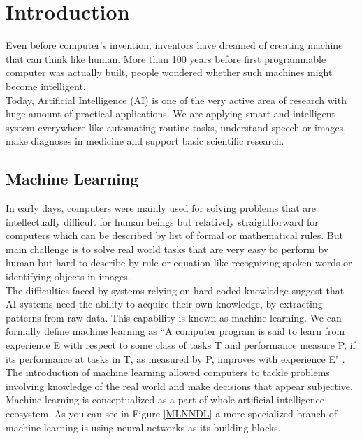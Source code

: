 \chapter{Introduction}\label{Introduction}
Even before computer's invention, inventors have dreamed of creating machine that can think like human. More than 100 years before first programmable computer was actually built, people wondered whether such machines might become intelligent.\\

Today, Artificial Intelligence (AI) is one of the very active area of research with huge amount of practical applications.
We are applying smart and intelligent system everywhere like automating routine tasks, understand speech or images, make diagnoses in medicine and support basic scientific research.

\section{Machine Learning}
 In early days, computers were mainly used for solving problems that are intellectually difficult for human beings but relatively straightforward for computers which can be described by list of formal or mathematical rules. But main challenge is to solve real world tasks that are very easy to perform by human but hard to describe by rule or equation like recognizing spoken words or identifying objects in images.\\

 The difficulties faced by systems relying on hard-coded knowledge suggest that AI systems need the ability to acquire their own knowledge, by extracting patterns from raw data. This capability is known as machine learning. We can formally define machine learning as ``A computer program is said to learn from experience E with respect to some class of tasks T and performance measure P, if its performance at tasks in T, as measured by P, improves with  experience E" .\\

 The introduction of machine learning allowed computers to tackle problems involving knowledge of the real world and make decisions that appear subjective.
 Machine learning is conceptualized as a part of whole  artificial intelligence ecosystem. As you can see in Figure \ref{MLNNDL} a more specialized branch of machine learning is using neural networks as its building blocks.

